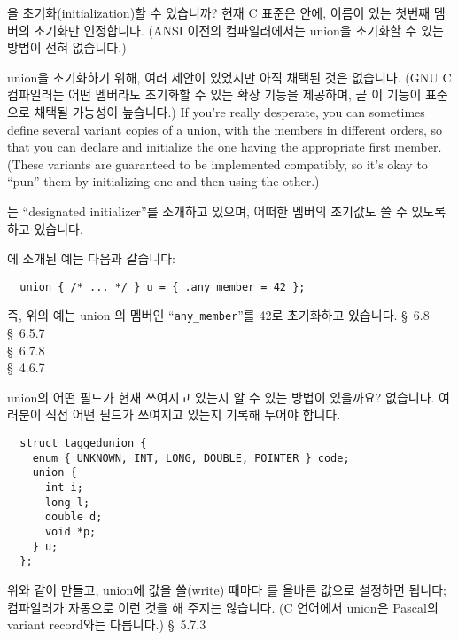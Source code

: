 \begin{faq}
	을 초기화(initialization)할 수 있습니까?
\A
	현재 C 표준은  안에, 이름이 있는 첫번째 멤버의 초기화만
	인정합니다. (ANSI 이전의 컴파일러에서는 union을 초기화할 수 있는 방법이 전혀 없습니다.)

        union을 초기화하기 위해, 여러 제안이 있었지만 아직 채택된 것은 없습니다.
        (GNU C 컴파일러는 어떤 멤버라도 초기화할 수 있는 확장 기능을 제공하며, 곧 이 기능이
        표준으로 채택될 가능성이 높습니다.)
        If you're really desperate, you can sometimes define several
        variant copies of a union, with the members in different orders,
        so that you can declare and initialize the one having the
        appropriate first member. (These variants are guaranteed to be
        implemented compatibly, so it's okay to ``pun'' them by initializing
        one and then using the other.)
        
        \cite{c9x}는 ``designated initializer''를 소개하고 있으며, 어떠한
	멤버의 초기값도 쓸 수 있도록 하고 있습니다.

\T
        \cite{c9x}에 소개된 예는 다음과 같습니다:
\begin{verbatim}
  union { /* ... */ } u = { .any_member = 42 };
\end{verbatim}
        즉, 위의 예는 union 의 멤버인 ``\verb+any_member+''를
        42로 초기화하고 있습니다.
\R
	\cite{kr2} \S\ 6.8  \\
	\cite{c89} \S\ 6.5.7 \\
	\cite{c9x} \S\ 6.7.8 \\
	\cite{hs} \S\ 4.6.7 
\end{faq}

\begin{faq}
        union의 어떤 필드가 현재 쓰여지고 있는지 알 수 있는 방법이 있을까요?
\A
        없습니다. 여러분이 직접 어떤 필드가 쓰여지고 있는지 기록해 두어야 합니다.
\begin{verbatim}
  struct taggedunion {
    enum { UNKNOWN, INT, LONG, DOUBLE, POINTER } code;
    union {
      int i;
      long l;
      double d;
      void *p;
    } u;
  };
\end{verbatim}
        위와 같이 만들고, union에 값을 쓸(write) 때마다 를 올바른 값으로
        설정하면 됩니다; 컴파일러가 자동으로 이런 것을 해 주지는 않습니다.
        (C 언어에서 union은 Pascal의 variant record와는 다릅니다.)
\R
        \cite{hs} \S\ 5.7.3 
\end{faq}

